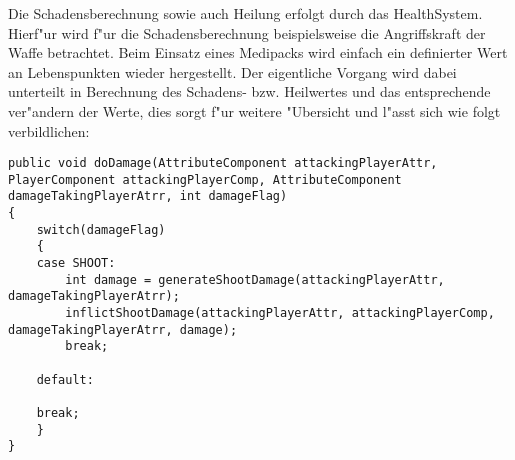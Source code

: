 Die Schadensberechnung sowie auch Heilung erfolgt durch das HealthSystem. Hierf"ur wird f"ur die Schadensberechnung beispielsweise die Angriffskraft der Waffe betrachtet. Beim Einsatz eines Medipacks wird einfach ein definierter Wert an Lebenspunkten wieder hergestellt.
Der eigentliche Vorgang wird dabei unterteilt in Berechnung des Schadens- bzw. Heilwertes und das entsprechende ver"andern der Werte, dies sorgt f"ur weitere "Ubersicht und l"asst sich wie folgt verbildlichen:

\begin{lstlisting}[breaklines = true]
public void doDamage(AttributeComponent attackingPlayerAttr, PlayerComponent attackingPlayerComp, AttributeComponent damageTakingPlayerAtrr, int damageFlag)
{
	switch(damageFlag)
	{
	case SHOOT:
		int damage = generateShootDamage(attackingPlayerAttr, damageTakingPlayerAtrr);
		inflictShootDamage(attackingPlayerAttr, attackingPlayerComp, damageTakingPlayerAtrr, damage);                    
		break;

	default:

	break;
	}
}
\end{lstlisting}